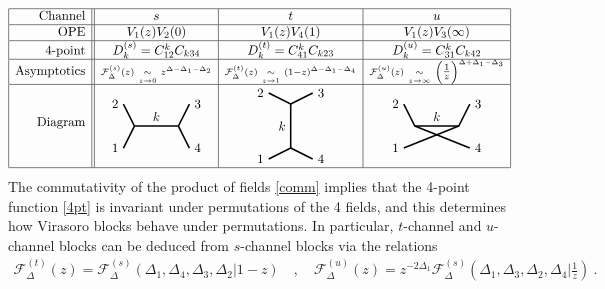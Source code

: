 \documentclass[12pt, a4paper]{article}
\theoremstyle{break}
\begin{document}
\begin{align}
 \begin{array}{|r||c|c|c|}
  \hline 
  \text{Channel} & s & t & u
  \\ \hline
  \text{OPE} & V_1(z)V_2(0) & V_1(z)V_4(1) & V_1(z)V_3(\infty)
  \\ \hline 
  \text{4-point} & D^{(s)}_k = C_{12}^k C_{k34} & D^{(t)}_k = C_{41}^k C_{k23} & D^{(u)}_k = C_{31}^k C_{k42}
\\ \hline 
  \text{Asymptotics} & {\scriptstyle \mathcal{F}^{(s)}_{\Delta}(z)\ \underset{z\to 0}{\sim}\ z^{\Delta-\Delta_1-\Delta_2}} & {\scriptstyle\mathcal{F}^{(t)}_{\Delta}(z)\ \underset{z\to 1}{\sim}\ (1-z)^{\Delta-\Delta_1-\Delta_4}}
  & {\scriptstyle\mathcal{F}^{(u)}_\Delta(z)\  \underset{z\to \infty}{\sim}\ \left(\tfrac{1}{z}\right)^{\Delta+\Delta_1-\Delta_3}}
  \\
  \hline 
\text{Diagram} & 
\begin{tikzpicture}[baseline=(current  bounding  box.center), very thick, scale = .3]
\draw (-1,2) node [left] {$2$} -- (0,0) -- node [above] {$k$} (4,0) -- (5,2) node [right] {$3$};
\draw (-1,-2) node [left] {$1$} -- (0,0);
\draw (4,0) -- (5,-2) node [right] {$4$};
\end{tikzpicture}
& 
\begin{tikzpicture}[baseline=(current  bounding  box.center), very thick, scale = .3]
 \draw (-2,3) node [left] {$2$} -- (0,2) -- node [left] {$k$} (0,-2) -- (-2, -3) node [left] {$1$};
\draw (0,2) -- (2,3) node [right] {$3$};
\draw (0,-2) -- (2, -3) node [right] {$4$};
\end{tikzpicture}
& 
\begin{tikzpicture}[baseline=(current  bounding  box.center), very thick, scale = .3]
\draw (-1,2) node [left] {$2$} -- (0,0) -- node [above] {$k$} (4,0) -- (5,2) node [right] {$3$};
\draw (-1,-2) node [left] {$1$} -- (4,0);
\draw (0,0) -- (5,-2) node [right] {$4$};
\end{tikzpicture}
  \\
  \hline 
 \end{array}
 \label{stu}
\end{align}
The commutativity of the product of fields \eqref{comm} implies that the 4-point function \eqref{4pt} is invariant under permutations of the 4 fields, and this determines how Virasoro blocks behave under permutations. In particular, $t$-channel and $u$-channel blocks can be deduced from $s$-channel blocks via the relations 
\begin{align}
 \mathcal{F}^{(t)}_\Delta(z) = \mathcal{F}^{(s)}_\Delta(\Delta_1,\Delta_4,\Delta_3,\Delta_2|1-z) \quad , \quad 
 \mathcal{F}^{(u)}_\Delta(z) = z^{-2\Delta_1}\mathcal{F}^{(s)}_\Delta(\Delta_1,\Delta_3,\Delta_2,\Delta_4|\tfrac{1}{z})\ .
 \label{stotu}
\end{align}
\end{document}
